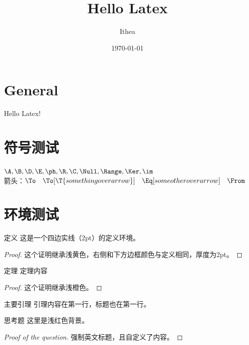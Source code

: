 \documentclass[UTF8]{ctexart} %
\title{Hello Latex}
\author{Ithea}
\date{\today}
\begin{document}
\section{General}

{\huge
Hello Latex!}

\section{符号测试}
\(\A, \B, \D, \E, \ph, \R, \C, \Null, \Range, \Ker,\im\) \\
箭头：\(\To \quad \To[\T{something over arrow}] \quad \Eq[some other over arrow]\quad \From\)


\section{环境测试}

\begin{define}{定义}
这是一个四边实线（2pt）的定义环境。
\end{define}

\begin{proof}
这个证明继承浅黄色，右侧和下方边框颜色与定义相同，厚度为2pt。
\end{proof}

\begin{theorem}{定理}
定理内容
\end{theorem}

\begin{proof}
这个证明继承浅橙色。
\end{proof}

\begin{lemma}{主要引理}
引理内容在第一行，标题也在第一行。
\end{lemma}

\begin{question}{思考题}
这里是浅红色背景。
\end{question}

\begin{proof}[Proof of the question]
强制英文标题，且自定义了内容。
\end{proof}
\end{document}
